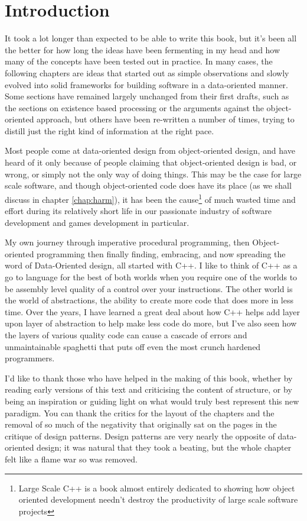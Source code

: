 \chapter*{Introduction}

It took a lot longer than expected to be able to write this book, but it's been
all the better for how long the ideas have been fermenting in my head and how
many of the concepts have been tested out in practice. In many cases, the
following chapters are ideas that started out as simple observations and slowly
evolved into solid frameworks for building software in a data-oriented manner.
Some sections have remained largely unchanged from their first drafts, such as
the sections on existence based processing or the arguments against the
object-oriented approach, but others have been re-written a number of times,
trying to distill just the right kind of information at the right pace.

Most people come at data-oriented design from object-oriented design, and have
heard of it only because of people claiming that object-oriented design is bad,
or wrong, or simply not the only way of doing things. This may be the case for
large scale software, and though object-oriented code does have its place (as
we shall discuss in chapter \ref{chap:harm}), it has been the cause\footnote{
Large Scale C++ is a book almost entirely dedicated to showing how object
oriented development needn't destroy the productivity of large scale software
projects} of much wasted time and effort during its relatively short life in
our passionate industry of software development and games development in
particular.

My own journey through imperative procedural programming, then Object-oriented
programming then finally finding, embracing, and now spreading the word of
Data-Oriented design, all started with C++. I like to think of C++ as a go to
language for the best of both worlds when you require one of the worlds to be
assembly level quality of a control over your instructions. The other world is
the world of abstractions, the ability to create more code that does more in
less time. Over the years, I have learned a great deal about how C++ helps add
layer upon layer of abstraction to help make less code do more, but I've also
seen how the layers of various quality code can cause a cascade of errors and
unmaintainable spaghetti that puts off even the most crunch hardened
programmers.

I'd like to thank those who have helped in the making of this book, whether by
reading early versions of this text and criticising the content of structure,
or by being an inspiration or guiding light on what would truly best represent
this new paradigm. You can thank the critics for the layout of the chapters and
the removal of so much of the negativity that originally sat on the pages in
the critique of design patterns. Design patterns are very nearly the opposite
of data-oriented design; it was natural that they took a beating, but the whole
chapter felt like a flame war so was removed.

